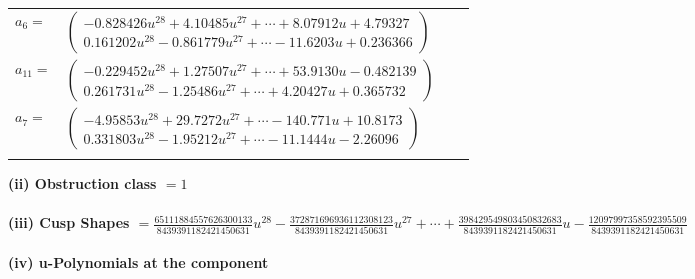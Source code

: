 \documentclass[1p]{elsarticle_modified}
\theoremstyle{definition}
\begin{document}
\begin{tabular}{m{7pt} m{180pt} m{7pt} m{180pt} }
\flushright $a_{6}=$&$\begin{pmatrix}-0.828426 u^{28}+4.10485 u^{27}+\cdots+8.07912 u+4.79327\\0.161202 u^{28}-0.861779 u^{27}+\cdots-11.6203 u+0.236366\end{pmatrix}$ \\
\flushright $a_{11}=$&$\begin{pmatrix}-0.229452 u^{28}+1.27507 u^{27}+\cdots+53.9130 u-0.482139\\0.261731 u^{28}-1.25486 u^{27}+\cdots+4.20427 u+0.365732\end{pmatrix}$ \\
\flushright $a_{7}=$&$\begin{pmatrix}-4.95853 u^{28}+29.7272 u^{27}+\cdots-140.771 u+10.8173\\0.331803 u^{28}-1.95212 u^{27}+\cdots-11.1444 u-2.26096\end{pmatrix}$\\&\end{tabular}
\flushleft \textbf{(ii) Obstruction class $= 1$}\\~\\
\flushleft \textbf{(iii) Cusp Shapes $= \frac{65111884557626300133}{8439391182421450631} u^{28}-\frac{372871696936112308123}{8439391182421450631} u^{27}+\cdots+\frac{398429549803450832683}{8439391182421450631} u-\frac{12097997358592395509}{8439391182421450631}$}\\~\\
\newpage\renewcommand{\arraystretch}{1}
\flushleft \textbf{(iv) u-Polynomials at the component}\newline \\
\end{document}
